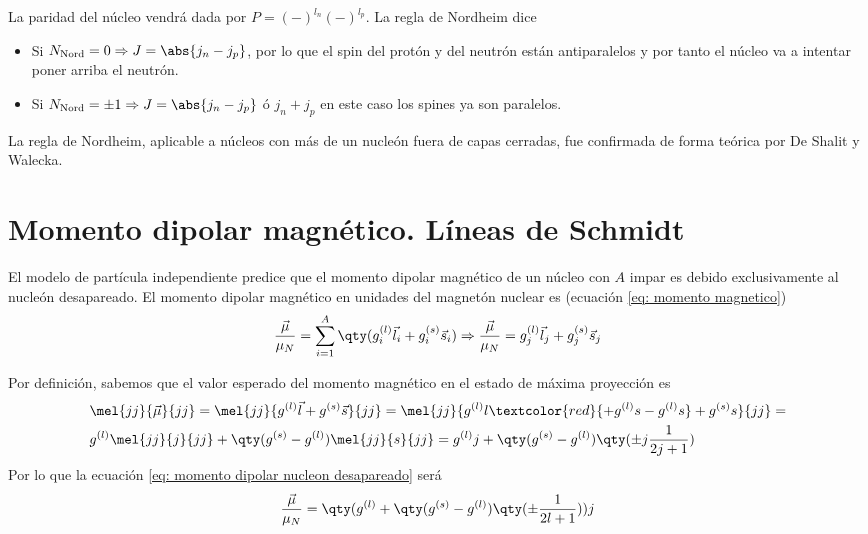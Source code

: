 La paridad del núcleo vendrá dada por $P=(-)^{l_n}(-)^{l_p}$. La regla de Nordheim dice 
\begin{itemize}
    \item Si $N_\mathrm{Nord}=0 \Rightarrow J=\abs{j_n-j_p}$, por lo que el spin del protón y del neutrón están antiparalelos y por tanto el núcleo va a intentar poner arriba el neutrón.
    \item Si $N_\mathrm{Nord}=\pm 1 \Rightarrow J=\abs{j_n-j_p}$ ó $j_n+j_p$ en este caso los spines ya son paralelos.
\end{itemize}

La regla de Nordheim, aplicable a núcleos con más de un nucleón fuera de capas cerradas, fue confirmada de forma teórica por De Shalit y Walecka.

\section{Momento dipolar magnético. Líneas de Schmidt}
El modelo de partícula independiente predice que el momento dipolar magnético de un núcleo con $A$ impar es debido exclusivamente al nucleón desapareado. El momento dipolar magnético en unidades del magnetón nuclear es (ecuación \ref{eq: momento magnetico})
\begin{equation}
    \frac{\vec{\mu}}{\mu_N}=\sum_{i=1}^A \qty(g_i^{(l)}\vec{l}_i+g_i^{(s)}\vec{s}_i) \Rightarrow \frac{\vec{\mu}}{\mu_N}=g_j^{(l)}\vec{l}_j+g_j^{(s)}\vec{s}_j
    \label{eq: momento dipolar nucleon desapareado}
\end{equation}

Por definición, sabemos que el valor esperado del momento magnético en el estado de máxima proyección es 
$$\begin{aligned}
    &\mel{jj}{\vec{\mu}}{jj}=\mel{jj}{g^{(l)}\vec{l}+g^{(s)}\vec{s}}{jj}=\mel{jj}{g^{(l)}l\textcolor{red}{+g^{(l)}s-g^{(l)}s}+g^{(s)}s}{jj}=\\&g^{(l)}\mel{jj}{j}{jj}+ \qty(g^{(s)}-g^{(l)}) \mel{jj}{s}{jj}=g^{(l)}j+\qty(g^{(s)}-g^{(l)})\qty(\pm j\frac{1}{2j+1})
\end{aligned}$$
Por lo que la ecuación \ref{eq: momento dipolar nucleon desapareado} será
\begin{equation}
    \frac{\vec{\mu}}{\mu_N}=\qty(g^{(l)}+\qty(g^{(s)}-g^{(l)})\qty(\pm \frac{1}{2l+1}))j
    \label{eq: resultado momento dipolar magnetico nucleon desapareado}
\end{equation}

